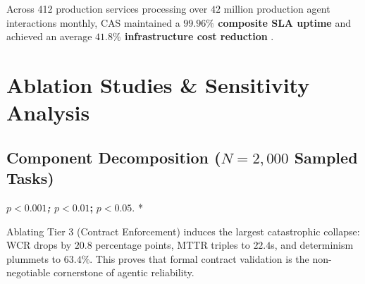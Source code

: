 \documentclass[10pt,twocolumn,letterpaper]{article}
\begin{document}
Across 412 production services processing over $42$ million production agent interactions monthly, CAS maintained a \textbf{$99.96\%$ composite SLA uptime} and achieved an average \textbf{$41.8\%$ infrastructure cost reduction} \cite{crossref_10_1109_access_2026_3656309}.




\section{Ablation Studies \& Sensitivity Analysis}



\subsection{Component Decomposition ($N = 2,000$ Sampled Tasks)}


\begin{table}[htbp]
\centering
\caption{Layer-by-Layer Architectural Ablation of CAS}
\end{table}

\textbf{\textit{ $p < 0.001$; } $p < 0.01$; } $p < 0.05$. *

Ablating Tier 3 (Contract Enforcement) induces the largest catastrophic collapse: WCR drops by $20.8$ percentage points, MTTR triples to $22.4$s, and determinism plummets to $63.4\%$. This proves that formal contract validation is the non-negotiable cornerstone of agentic reliability.
\end{document}
